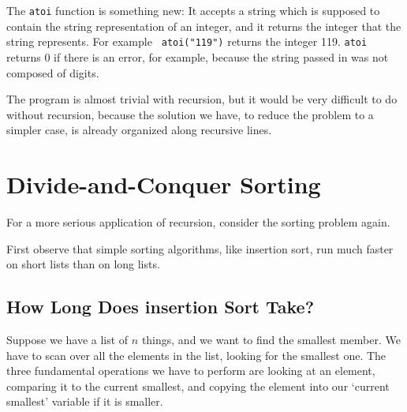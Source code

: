 \begin{flushleft}
\verb%int main(int argc, char **argv)%
\\* \verb%{%
\\* \verb%  int num_rings;%

\verb%  if (argc != 2) {%
\\* \verb%    fprintf(stderr, "Usage: %\verb-%-\verb%s number_of_rings\n", argv[0]);%
\\* \verb%    return 1;%
\\* \verb%  }%

\verb%  num_rings = atoi(argv[1]);%

\verb%  hanoi(num_rings, 1, 3);%

\verb%  return 0;%
\\* \verb%}%
\end{flushleft}

    The {\tt atoi} function is something new: It accepts a string which
is supposed to contain the string representation of an integer, and it
returns the integer that the string represents.  For example {\tt
atoi("119")} returns the integer 119.  {\tt atoi} returns 0 if there is
an error, for example, because the string passed in was not composed of
digits.

The program is almost trivial with recursion, but it would be very
difficult to do without recursion, because the solution we have, to
reduce the problem to a simpler case, is already organized along
recursive lines.

\section{Divide-and-Conquer Sorting}

For a more serious application of recursion, consider the sorting
problem again.

First observe that simple sorting algorithms, like insertion sort, run much
faster on short lists than on long lists.

\subsection{How Long Does insertion Sort Take?}

    Suppose we have a list of $n$ things, and we want to find the
smallest member.  We have to scan over all the elements in the list,
looking for the smallest one.  The three fundamental operations we have
to perform are looking at an element, comparing it to the current
smallest, and copying the element into our `current smallest' variable
if it is smaller.

